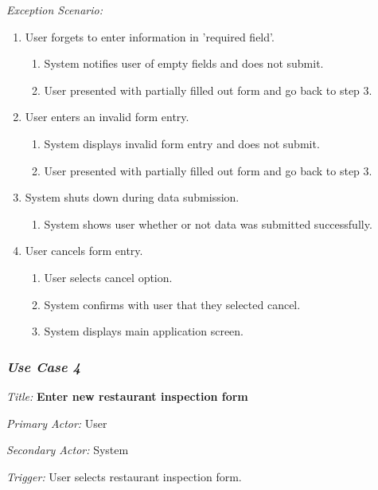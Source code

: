 \documentclass[twoside,letterpaper]{article}
\begin{document}
{\color{black} \textit{Exception Scenario:}}
\begin{enumerate}
\item User forgets to enter information in 'required field'.
\begin{enumerate}
\item System notifies user of empty fields and does not submit.
\item User presented with partially filled out form and go back to step 3.
\end{enumerate}

\item User enters an invalid form entry.
\begin{enumerate}
\item System displays invalid form entry and does not submit.
\item User presented with partially filled out form and go back to step 3.
\end{enumerate}

\item System shuts down during data submission.
\begin{enumerate}
\item System shows user whether or not data was submitted successfully. 
\end{enumerate}

\item User cancels form entry.
\begin{enumerate}
\item User selects cancel option.
\item System confirms with user that they selected cancel.
\item System displays main application screen.
\end{enumerate}
\end{enumerate}


\subsubsection{\textit{Use Case 4}} 

\textit{Title: }{\bfseries\color{black} Enter new restaurant inspection form}

{\color{black} \textit{Primary Actor:} User}

{\color{black} \textit{Secondary Actor:} System}

{\color{black} \textit{Trigger:} User selects restaurant inspection form.}
\end{document}
